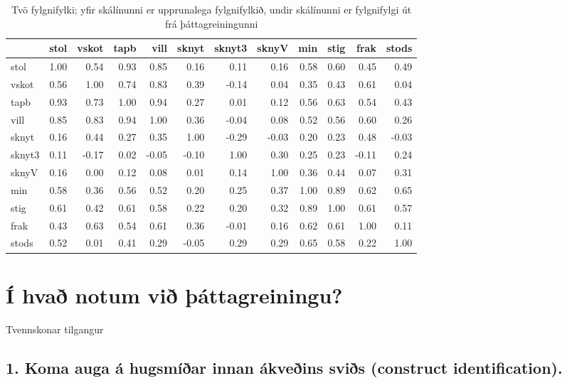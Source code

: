 \documentclass[]{book}
\begin{document}
\begin{table}

\caption{\label{tab:popcorrmatrix2}Tvö fylgnifylki; yfir skálínunni er upprunalega fylgnifylkið, undir skálínunni er fylgnifylgi út frá þáttagreiningunni}
\centering
\begin{tabular}[t]{l|r|r|r|r|r|r|r|r|r|r|r}
\hline
  & stol & vskot & tapb & vill & sknyt & sknyt3 & sknyV & min & stig & frak & stods\\
\hline
stol & 1.00 & 0.54 & 0.93 & 0.85 & 0.16 & 0.11 & 0.16 & 0.58 & 0.60 & 0.45 & 0.49\\
\hline
vskot & 0.56 & 1.00 & 0.74 & 0.83 & 0.39 & -0.14 & 0.04 & 0.35 & 0.43 & 0.61 & 0.04\\
\hline
tapb & 0.93 & 0.73 & 1.00 & 0.94 & 0.27 & 0.01 & 0.12 & 0.56 & 0.63 & 0.54 & 0.43\\
\hline
vill & 0.85 & 0.83 & 0.94 & 1.00 & 0.36 & -0.04 & 0.08 & 0.52 & 0.56 & 0.60 & 0.26\\
\hline
sknyt & 0.16 & 0.44 & 0.27 & 0.35 & 1.00 & -0.29 & -0.03 & 0.20 & 0.23 & 0.48 & -0.03\\
\hline
sknyt3 & 0.11 & -0.17 & 0.02 & -0.05 & -0.10 & 1.00 & 0.30 & 0.25 & 0.23 & -0.11 & 0.24\\
\hline
sknyV & 0.16 & 0.00 & 0.12 & 0.08 & 0.01 & 0.14 & 1.00 & 0.36 & 0.44 & 0.07 & 0.31\\
\hline
min & 0.58 & 0.36 & 0.56 & 0.52 & 0.20 & 0.25 & 0.37 & 1.00 & 0.89 & 0.62 & 0.65\\
\hline
stig & 0.61 & 0.42 & 0.61 & 0.58 & 0.22 & 0.20 & 0.32 & 0.89 & 1.00 & 0.61 & 0.57\\
\hline
frak & 0.43 & 0.63 & 0.54 & 0.61 & 0.36 & -0.01 & 0.16 & 0.62 & 0.61 & 1.00 & 0.11\\
\hline
stods & 0.52 & 0.01 & 0.41 & 0.29 & -0.05 & 0.29 & 0.29 & 0.65 & 0.58 & 0.22 & 1.00\\
\hline
\end{tabular}
\end{table}

\hypertarget{uxed-hvauxf0-notum-viuxf0-uxfeuxe1ttagreiningu}{%
\section{Í hvað notum við þáttagreiningu?}\label{uxed-hvauxf0-notum-viuxf0-uxfeuxe1ttagreiningu}}

Tvennskonar tilgangur

\hypertarget{koma-auga-uxe1-hugsmuxeduxf0ar-innan-uxe1kveuxf0ins-sviuxf0s-construct-identification.}{%
\subsection{1. Koma auga á hugsmíðar innan ákveðins sviðs (construct identification).}\label{koma-auga-uxe1-hugsmuxeduxf0ar-innan-uxe1kveuxf0ins-sviuxf0s-construct-identification.}}
\end{document}
